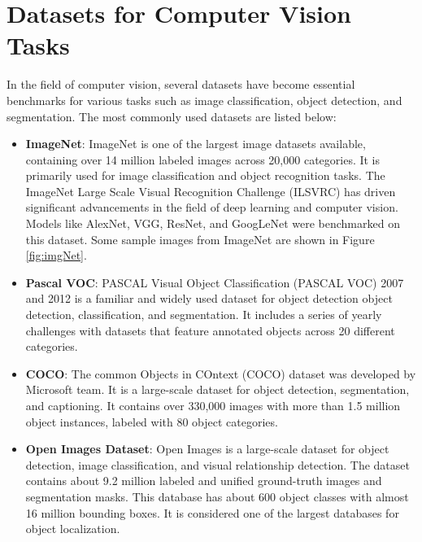 \section{Datasets for Computer Vision Tasks}
In the field of computer vision, several datasets \cite{web:cvDatasets} have become essential benchmarks for various tasks such as image classification, object detection, and segmentation. The most commonly used datasets are listed below:
\begin{itemize}[b] 
\item \textbf{ImageNet}:  ImageNet \cite{web:ILSVRC} is one of the largest image datasets available, containing over 14 million labeled images across 20,000 categories. It is primarily used for image classification and object recognition tasks. The ImageNet Large Scale Visual Recognition Challenge (ILSVRC) has driven significant advancements in the field of deep learning and computer vision. Models like AlexNet, VGG, ResNet, and GoogLeNet were benchmarked on this dataset. Some sample images from ImageNet are shown in Figure \ref{fig:imgNet}.
    \item \textbf{Pascal VOC}: PASCAL Visual Object Classification (PASCAL VOC) 2007 and 2012 \cite{web:Pascal} is a familiar and widely used dataset for object detection object detection, classification, and segmentation. It includes a series of yearly challenges with datasets that feature annotated objects across 20 different categories.
    \item \textbf{COCO}: The common Objects in COntext (COCO) dataset \cite{web:CoCo} was developed by Microsoft team. It is a large-scale dataset for object detection, segmentation, and captioning. It contains over 330,000 images with more than 1.5 million object instances, labeled with 80 object categories.
    \item \textbf{Open Images Dataset}: Open Images \cite{web:OpenImage} is a large-scale dataset for object detection, image classification, and visual relationship detection. The dataset contains about 9.2 million labeled and unified ground-truth images and segmentation masks. This database has about 600 object classes with almost 16 million bounding boxes. It is considered one of the largest databases for object localization.
\end{itemize}

